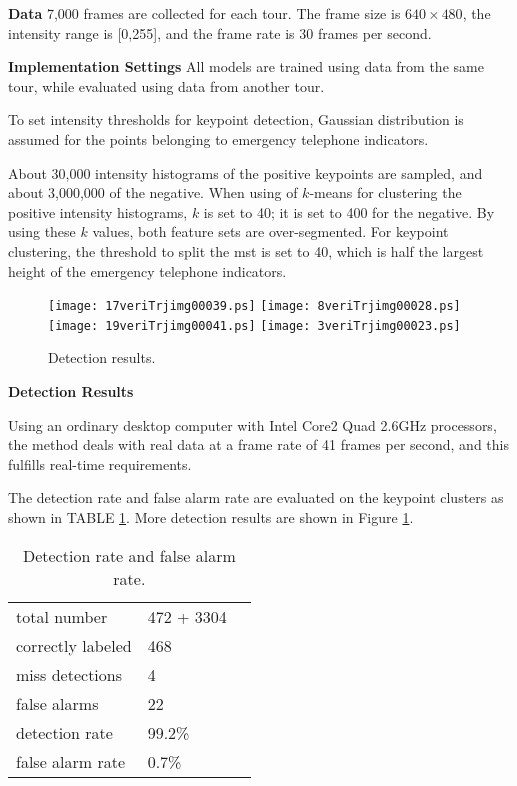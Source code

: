 \documentclass{JoITSRstyle}
\begin{document}
\textbf{Data}   7,000 frames are collected for each tour. The frame size is $640\times 480$, the intensity range is [0,255], and the frame rate is 30 frames per second.

\textbf{Implementation Settings} All models are trained using data from the same tour, while evaluated using data from another tour.

To set intensity thresholds for keypoint detection, Gaussian distribution is assumed for the points belonging to emergency telephone indicators. 

About 30,000 intensity histograms of the positive keypoints are sampled, and about 3,000,000 of the negative. When using of $k$-means for clustering the positive intensity histograms, $k$ is set to 40; it is set to 400 for the negative. By using these $k$ values,  both feature sets are over-segmented. 
For keypoint clustering, the threshold to split the mst is set to 40, which is half the largest height of the emergency telephone indicators.




\begin{figure}
{
\texttt{[image: 17veriTrjimg00039.ps]}
}
{
\texttt{[image: 8veriTrjimg00028.ps]}
}\\
{
\texttt{[image: 19veriTrjimg00041.ps]}
}
{
\texttt{[image: 3veriTrjimg00023.ps]}
}
\caption{Detection results.}
\label{fig:sixs}
\end{figure}

\textbf{Detection Results}

Using an ordinary desktop computer with Intel Core2 Quad 2.6GHz processors, the method deals with real data at a frame rate of 41 frames per second, and this fulfills real-time requirements.


The detection rate and false alarm rate are evaluated on the keypoint clusters as shown in TABLE \ref{tb:tb2}.
More detection results are shown in Figure \ref{fig:sixs}.
\begin{table}[h]
\centering
\begin{tabular}{lll}
     \hline
     \hline
    total number &	472 + 3304  \\
    correctly labeled &	468   \\
    miss detections &	4 &	  \\
    false alarms &	22    \\
    detection rate &	99.2\% &	  \\
    false alarm rate &	0.7\% &	   \\
   \hline
\end{tabular}
\caption{Detection rate and false alarm rate.}\label{tb:tb2}
\end{table}
\end{document}
